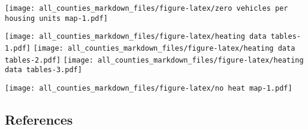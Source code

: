 \documentclass[
]{article}
\begin{document}
\texttt{[image: all\_counties\_markdown\_files/figure-latex/zero vehicles per housing units map-1.pdf]}

\texttt{[image: all\_counties\_markdown\_files/figure-latex/heating data tables-1.pdf]}
\texttt{[image: all\_counties\_markdown\_files/figure-latex/heating data tables-2.pdf]}
\texttt{[image: all\_counties\_markdown\_files/figure-latex/heating data tables-3.pdf]}

\texttt{[image: all\_counties\_markdown\_files/figure-latex/no heat map-1.pdf]}

\hypertarget{references}{%
\subsection{References}\label{references}}
\end{document}
